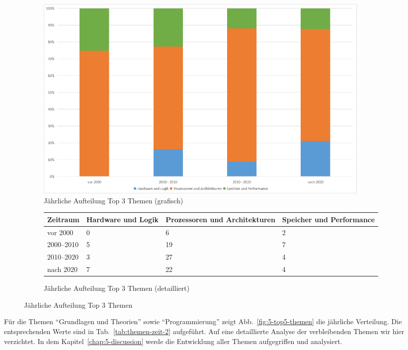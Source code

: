 \begin{figure}[!htbp]
    \centering
    \begin{subfigure}[b]{0.48\textwidth}
        \centering
        \includegraphics[width=0.90\textwidth]{graphics/4-top3-themen-jahr.png}
        \caption{Jährliche Aufteilung Top 3 Themen (grafisch)}
        \label{fig:4-top3-themen}
    \end{subfigure}
    \hfill
    \begin{subfigure}[b]{0.48\textwidth}
        \centering
        \tiny
        \begin{tabularx}{\textwidth}{lXXX}
            \hline
            \textbf{Zeitraum} & \textbf{Hardware und Logik} & \textbf{Prozessoren und Architekturen} & \textbf{Speicher und Performance} \\
            \hline
            vor 2000      & 0  & 6  & 2 \\
            2000--2010    & 5  & 19 & 7 \\
            2010--2020    & 3  & 27 & 4 \\
            nach 2020     & 7  & 22 & 4 \\
            \hline
        \end{tabularx}
        \caption{Jährliche Aufteilung Top 3 Themen (detailliert)}
        \label{tab:themen-zeit}
    \end{subfigure}
    \caption{Jährliche Aufteilung Top 3 Themen}
    \label{fig:pub-typen}
\end{figure}

Für die Themen \enquote{Grundlagen und Theorien} sowie \enquote{Programmierung} zeigt Abb.~\ref{fig:5-top5-themen} die jährliche Verteilung. Die entsprechenden Werte sind in Tab.~\ref{tab:themen-zeit-2} aufgeführt. Auf eine detaillierte Analyse der verbleibenden Themen wir hier verzichtet. In dem Kapitel~\ref{chap:5-discussion} werde die Entwicklung aller Themen aufgegriffen und analysiert.

